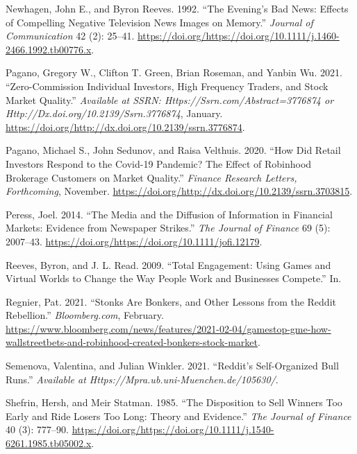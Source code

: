 \documentclass[12pt,]{article}
\begin{document}
\leavevmode\hypertarget{ref-newhagen1992}{}%
Newhagen, John E., and Byron Reeves. 1992. ``The Evening's Bad News:
Effects of Compelling Negative Television News Images on Memory.''
\emph{Journal of Communication} 42 (2): 25--41.
\url{https://doi.org/https://doi.org/10.1111/j.1460-2466.1992.tb00776.x}.

\leavevmode\hypertarget{ref-eaton2021}{}%
Pagano, Gregory W., Clifton T. Green, Brian Roseman, and Yanbin Wu.
2021. ``Zero-Commission Individual Investors, High Frequency Traders,
and Stock Market Quality.'' \emph{Available at SSRN:
Https://Ssrn.com/Abstract=3776874 or
Http://Dx.doi.org/10.2139/Ssrn.3776874}, January.
\url{https://doi.org/http://dx.doi.org/10.2139/ssrn.3776874}.

\leavevmode\hypertarget{ref-pagano2020}{}%
Pagano, Michael S., John Sedunov, and Raisa Velthuis. 2020. ``How Did
Retail Investors Respond to the Covid-19 Pandemic? The Effect of
Robinhood Brokerage Customers on Market Quality.'' \emph{Finance
Research Letters, Forthcoming}, November.
\href{https://doi.org/http://dx.doi.org/10.2139/ssrn.3703815\%20}{https://doi.org/http://dx.doi.org/10.2139/ssrn.3703815}.

\leavevmode\hypertarget{ref-peress2014}{}%
Peress, Joel. 2014. ``The Media and the Diffusion of Information in
Financial Markets: Evidence from Newspaper Strikes.'' \emph{The Journal
of Finance} 69 (5): 2007--43.
\url{https://doi.org/https://doi.org/10.1111/jofi.12179}.

\leavevmode\hypertarget{ref-reeves2009}{}%
Reeves, Byron, and J. L. Read. 2009. ``Total Engagement: Using Games and
Virtual Worlds to Change the Way People Work and Businesses Compete.''
In.

\leavevmode\hypertarget{ref-regnier2021}{}%
Regnier, Pat. 2021. ``Stonks Are Bonkers, and Other Lessons from the
Reddit Rebellion.'' \emph{Bloomberg.com}, February.
\url{https://www.bloomberg.com/news/features/2021-02-04/gamestop-gme-how-wallstreetbets-and-robinhood-created-bonkers-stock-market}.

\leavevmode\hypertarget{ref-semenova2021}{}%
Semenova, Valentina, and Julian Winkler. 2021. ``Reddit's Self-Organized
Bull Runs.'' \emph{Available at
Https://Mpra.ub.uni-Muenchen.de/105630/}.

\leavevmode\hypertarget{ref-shefrin1985}{}%
Shefrin, Hersh, and Meir Statman. 1985. ``The Disposition to Sell
Winners Too Early and Ride Losers Too Long: Theory and Evidence.''
\emph{The Journal of Finance} 40 (3): 777--90.
\url{https://doi.org/https://doi.org/10.1111/j.1540-6261.1985.tb05002.x}.
\end{document}
